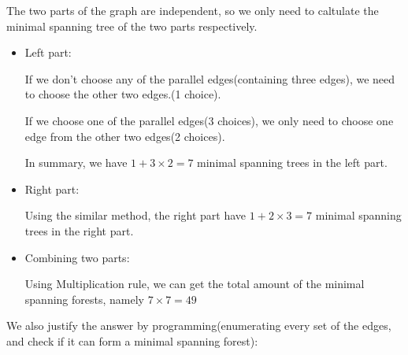 The two parts of the graph are independent, so we only need to caltulate the minimal spanning tree of the two parts respectively.
\begin{itemize}
	\item Left part:\par
		If we don't choose any of the parallel edges(containing three edges), we need to choose the other two edges.(1 choice).\par
		If we choose one of the parallel edges(3 choices), we only need to choose one edge from the other two edges(2 choices).\par
		In summary, we have $1 + 3 \times 2 = 7$ minimal spanning trees in the left part.
	\item Right part:\par
		Using the similar method, the right part have $1 + 2 \times 3 = 7$ minimal spanning trees in the right part.
	\item Combining two parts:\par
		Using Multiplication rule, we can get the total amount of the minimal spanning forests, namely $7 \times 7 = 49$
\end {itemize}
We also justify the answer by programming(enumerating every set of the edges, and check if it can form a minimal spanning forest):
